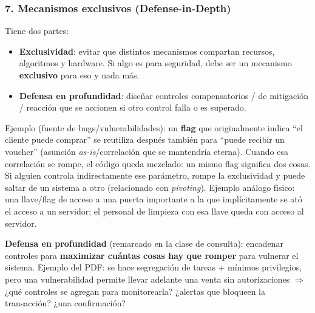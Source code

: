 \documentclass[../main.tex]{subfiles}
\begin{document}
\subsubsection{7. Mecanismos exclusivos (Defense-in-Depth)}
Tiene dos partes:
\begin{itemize}
  \item \textbf{Exclusividad}: evitar que distintos mecanismos compartan recursos, algoritmos y hardware. Si algo es para seguridad, debe ser un mecanismo \textbf{exclusivo} para eso y nada más.
  \item \textbf{Defensa en profundidad}: diseñar controles compensatorios / de mitigación / reacción que se accionen si otro control falla o es superado.
\end{itemize}
Ejemplo (fuente de bugs/vulnerabilidades): un \textbf{flag} que originalmente indica ``el cliente puede comprar'' se reutiliza después también para ``puede recibir un voucher'' (asunción \emph{as-is}/correlación que se mantendría eterna). Cuando esa correlación se rompe, el código queda mezclado: un mismo flag significa dos cosas. Si alguien controla indirectamente ese parámetro, rompe la exclusividad y puede saltar de un sistema a otro (relacionado con \emph{pivoting}). Ejemplo análogo físico: una llave/flag de acceso a una puerta importante a la que implícitamente se ató el acceso a un servidor; el personal de limpieza con esa llave queda con acceso al servidor.

\begin{examen}
\textbf{Defensa en profundidad} (remarcado en la clase de consulta): encadenar controles para \textbf{maximizar cuántas cosas hay que romper} para vulnerar el sistema. Ejemplo del PDF: se hace segregación de tareas + mínimos privilegios, pero una vulnerabilidad permite llevar adelante una venta sin autorizaciones $\Rightarrow$ ¿qué controles se agregan para monitorearla? ¿alertas que bloqueen la transacción? ¿una confirmación?
\end{examen}
\end{document}
